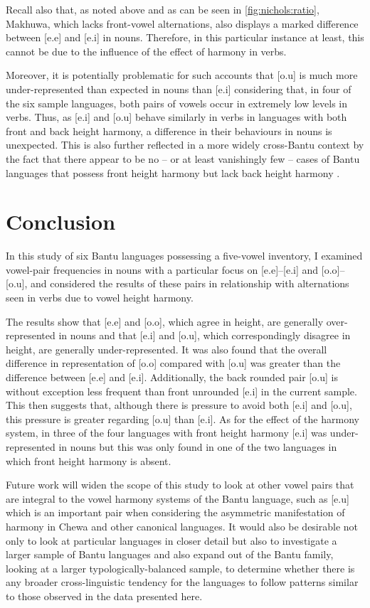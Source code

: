 \documentclass[output=paper]{langscibook}
\begin{document}
Recall also that, as noted above and as can be seen in \autoref{fig:nichols:ratio}, Makhuwa, which lacks front-vowel alternations, also displays a marked difference between [e.e] and [e.i] in nouns. Therefore, in this particular instance at least, this cannot be due to the influence of the effect of harmony in verbs.

Moreover, it is potentially problematic for such accounts that [o.u] is much more under-represented than expected in nouns than [e.i] considering that, in four of the six sample languages, both pairs of vowels occur in extremely low levels in verbs. Thus, as [e.i] and [o.u] behave similarly in verbs in languages with both front and back height harmony, a difference in their behaviours in nouns is unexpected. This is also further reflected in a more widely cross-Bantu context by the fact that there appear to be no -- or at least vanishingly few -- cases of Bantu languages that possess front height harmony but lack back height harmony \citep[245]{Hyman99}.

\section{Conclusion}

In this study of six Bantu languages possessing a five-vowel inventory, I examined vowel-pair frequencies in nouns with a particular focus on [e.e]--[e.i] and [o.o]--[o.u], and considered the results of these pairs in relationship with alternations seen in verbs due to vowel height harmony.

The results show that [e.e] and [o.o], which agree in height, are generally over-represented in nouns and that [e.i] and [o.u], which correspondingly disagree in height, are generally under-represented. It was also found that the overall difference in representation of [o.o] compared with [o.u] was greater than the difference between [e.e] and [e.i]. Additionally, the back rounded pair [o.u] is without exception less frequent than front unrounded [e.i] in the current sample. This then suggests that, although there is pressure to avoid both [e.i] and [o.u], this pressure is greater regarding [o.u] than [e.i]. As for the effect of the harmony system, in three of the four languages with front height harmony [e.i] was under-represented in nouns but this was only found in one of the two languages in which front height harmony is absent.

Future work will widen the scope of this study to look at other vowel pairs that are integral to the vowel harmony systems of the Bantu language, such as [e.u] which is an important pair when considering the asymmetric manifestation of harmony in Chewa and other canonical languages. It would also be desirable not only to look at particular languages in closer detail but also to investigate a larger sample of Bantu languages and also expand out of the Bantu family, looking at a larger typologically-balanced sample, to determine whether there is any broader cross-linguistic tendency for the languages to follow patterns similar to those observed in the data presented here.
\end{document}
